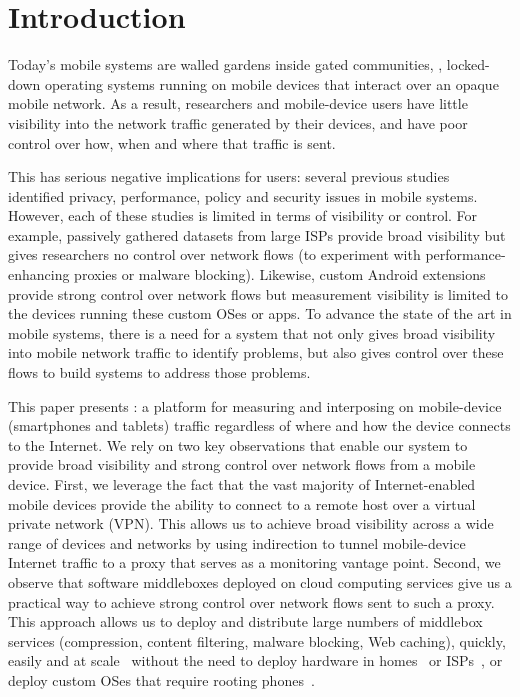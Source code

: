 \section{Introduction}
\label{sec:introduction}

Today's mobile systems are walled gardens inside gated communities, \ie{}, locked-down operating systems 
running on mobile devices that interact over an opaque mobile network. As a result, 
researchers and mobile-device users have little visibility into the network traffic generated by 
their devices, and have poor control over how, when and where that traffic is sent. 

This has serious negative implications for users: several previous studies~\cite{vallina-rod:ads,gerber:passivespeed,chen:wifi,enck:taintdroid,wang:middleboxes,sommers:cellwifi} 
identified privacy, performance, policy and security issues in mobile systems. However, each of these studies 
is limited in terms of visibility or control. For example, passively gathered datasets from large 
ISPs provide broad visibility but gives researchers no control over network flows (\eg to experiment with 
performance-enhancing proxies or malware blocking). Likewise, custom Android extensions provide 
strong control over network flows but measurement visibility is limited to the devices running these custom OSes or apps. 
To advance the state of the art in mobile systems, there is a need for a system that not only gives 
broad visibility into mobile network traffic to identify problems, but also gives control over these flows 
to build systems to address those problems. 

This paper presents \meddle:  a platform for measuring and interposing on mobile-device (\eg smartphones and tablets) 
traffic regardless of where and how the device connects to the Internet. We rely on two key observations 
that enable our system to provide broad visibility and strong control over network flows from a mobile device. 
First, we 
 leverage the fact that 
the vast majority of Internet-enabled mobile devices provide the ability to connect to a remote host over a virtual private 
network (VPN). This allows us to achieve broad visibility across a wide range of devices and networks by using indirection 
to tunnel mobile-device Internet traffic to a proxy that serves as a monitoring vantage point.
Second, we observe that  
software middleboxes deployed on cloud computing services give us a practical way to achieve strong control over 
network flows sent to such a proxy. This approach allows us to deploy and distribute large numbers 
of middlebox services (\eg compression, content filtering, malware blocking, Web caching), quickly, easily and at scale~\cite{sherry:middleboxes} without 
the need to deploy hardware in homes~\cite{bismarck} or ISPs~\cite{wang:middleboxes}, or 
deploy custom OSes that require rooting phones~\cite{taintdroid}. 

